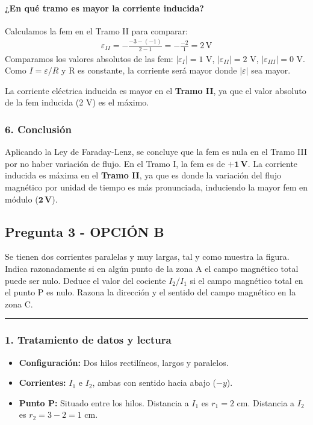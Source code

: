 \paragraph*{¿En qué tramo es mayor la corriente inducida?}
Calculamos la fem en el Tramo II para comparar:
\begin{gather}
    \varepsilon_{II} = - \frac{-3 - (-1)}{2 - 1} = - \frac{-2}{1} = 2 \, \text{V}
\end{gather}
Comparamos los valores absolutos de las fem: $|\varepsilon_I|=1$ V, $|\varepsilon_{II}|=2$ V, $|\varepsilon_{III}|=0$ V.
Como $I = \varepsilon/R$ y R es constante, la corriente será mayor donde $|\varepsilon|$ sea mayor.
\begin{cajaresultado}
    La corriente eléctrica inducida es mayor en el \textbf{Tramo II}, ya que el valor absoluto de la fem inducida (2 V) es el máximo.
\end{cajaresultado}

\subsubsection*{6. Conclusión}
\begin{cajaconclusion}
    Aplicando la Ley de Faraday-Lenz, se concluye que la fem es nula en el Tramo III por no haber variación de flujo. En el Tramo I, la fem es de $\mathbf{+1 \, V}$. La corriente inducida es máxima en el \textbf{Tramo II}, ya que es donde la variación del flujo magnético por unidad de tiempo es más pronunciada, induciendo la mayor fem en módulo ($\mathbf{2 \, V}$).
\end{cajaconclusion}

\newpage

\subsection{Pregunta 3 - OPCIÓN B}
\label{subsec:3B_2025_jun_res}

\begin{cajaenunciado}
Se tienen dos corrientes paralelas y muy largas, tal y como muestra la figura. Indica razonadamente si en algún punto de la zona A el campo magnético total puede ser nulo. Deduce el valor del cociente $I_2/I_1$ si el campo magnético total en el punto P es nulo. Razona la dirección y el sentido del campo magnético en la zona C.
\end{cajaenunciado}
\hrule

\subsubsection*{1. Tratamiento de datos y lectura}
\begin{itemize}
    \item \textbf{Configuración:} Dos hilos rectilíneos, largos y paralelos.
    \item \textbf{Corrientes:} $I_1$ e $I_2$, ambas con sentido hacia abajo ($-y$).
    \item \textbf{Punto P:} Situado entre los hilos. Distancia a $I_1$ es $r_1=2$ cm. Distancia a $I_2$ es $r_2=3-2=1$ cm.
\end{itemize}

